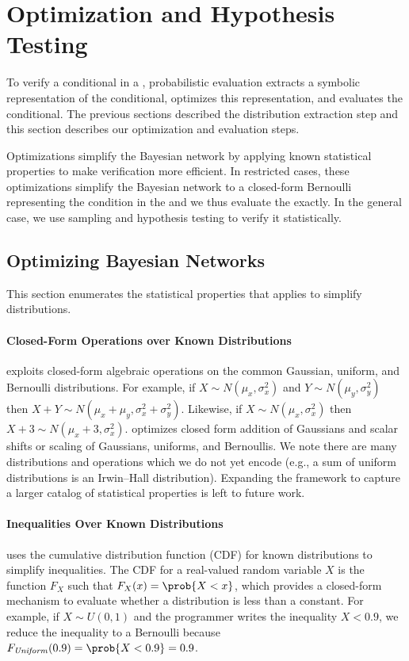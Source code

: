 \section{Optimization and Hypothesis Testing}
\label{passert:sec:mechanisms}

To verify a conditional in a \passert, probabilistic evaluation
extracts a symbolic representation of the conditional, optimizes this
representation, and evaluates the conditional.  The previous sections
described the distribution extraction step and this section describes our
optimization and evaluation steps. 

Optimizations simplify the Bayesian network by applying known
statistical properties to make verification more efficient. In
restricted cases, these optimizations simplify the Bayesian network to a
closed-form Bernoulli representing the condition in the \passert and we thus
evaluate the \passert exactly. In the general case, we use sampling
and hypothesis testing to verify it statistically.

\subsection{Optimizing Bayesian Networks}
\label{passert:sec:optim}

This section enumerates the statistical
properties that \tool applies to simplify distributions.

\paragraph{Closed-Form Operations over Known Distributions}
\tool exploits closed-form algebraic operations on the common
Gaussian, uniform, and Bernoulli distributions.
For example, if $X \sim N(\mu_x, \sigma^2_x)$ and $Y \sim N(\mu_y,
\sigma^2_y)$ then $X + Y \sim N(\mu_x + \mu_y, \sigma^2_x +
\sigma^2_y)$.  Likewise, if $X \sim N(\mu_x, \sigma^2_x)$ then $X + 3
\sim N(\mu_x + 3, \sigma^2_x)$.  \tool optimizes closed form addition
of Gaussians and scalar shifts or scaling of Gaussians, uniforms, and
Bernoullis.  We note there are many distributions and operations which
we do not yet encode (e.g., a sum of uniform distributions is
an Irwin--Hall distribution).
Expanding the framework to capture a larger catalog of statistical properties is left
to future work.

\paragraph{Inequalities Over Known Distributions} \tool uses the
cumulative distribution function (CDF) for known distributions to
simplify inequalities.  The CDF for a real-valued random variable $X$ is
the function $F_X$ such that $F_X(x) = \prob{X < x}$, which provides a
closed-form mechanism to evaluate whether a distribution is less than
a constant.  For example, if $X \sim U(0,1)$ and the programmer writes
the inequality $X < 0.9$, we reduce the inequality
to a Bernoulli because $F_{\mathit{Uniform}}(0.9) = \prob{X < 0.9} = 0.9$.  

